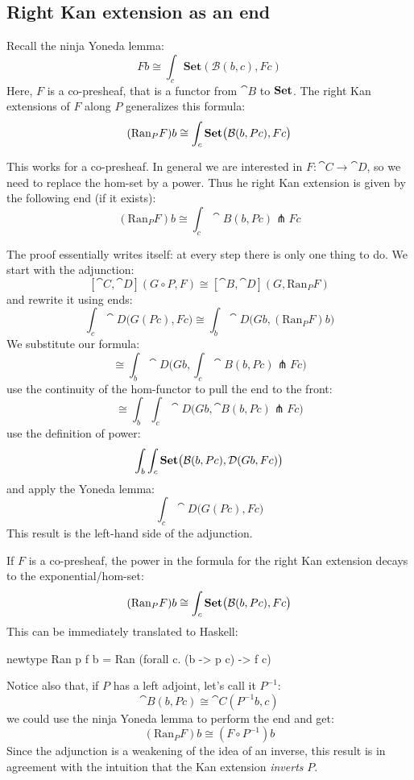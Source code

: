 \documentclass[DaoFP]{subfiles}
\begin{document}
\subsection{Right Kan extension as an end}

Recall the ninja Yoneda lemma:
\[ F b \cong \int_{c} \mathbf{Set} (\mathcal{B}(b, c), F c) \]
Here, $F$ is a co-presheaf, that is a functor from $\cat B$ to $\mathbf{Set}$. The right Kan extensions of $F$ along $P$ generalizes this formula:
\[ (\text{Ran}_P F) b \cong \int_c \mathbf{Set} \big( \mathcal{B} (b, P c), F c\big) \]

This works for a co-presheaf. In general we are interested in $F \colon \cat C \to \cat D$, so we need to replace the hom-set by a power. Thus he right Kan extension is given by the following end (if it exists):
 \[ (\text{Ran}_P F) b \cong \int_c \cat B (b, P c) \pitchfork F c \]
 
 The proof essentially writes itself: at every step there is only one thing to do. We start with the adjunction:
  \[ [\cat C, \cat D](G \circ P, F) \cong [\cat B, \cat D](G, \text{Ran}_P F) \]
and rewrite it using ends:
 \[ \int_c \cat D \big(G ( P c), F c\big) \cong \int_b \cat D\big(G b, (\text{Ran}_P F) b\big) \]
We substitute our formula:
 \[ \cong  \int_b \cat D\big(G b,\int_c \cat B (b, P c) \pitchfork F c \big)\]
use the continuity of the hom-functor to pull the end to the front:
\[  \cong  \int_b \int_c \cat D\big(G b, \cat B (b, P c) \pitchfork F c \big) \]
use the definition of power:
\[ \int_b \int_c \mathbf{Set} \big(  \mathcal{B} (b, P c), \mathcal{D} (G b, F c) \big) \]
and apply the Yoneda lemma:
\[ \int_c  \cat D \big(G (P c), F c\big) \]
This result is the left-hand side of the adjunction.
 
If $F$ is a co-presheaf, the power in the formula for the right Kan extension decays to the exponential/hom-set:
  \[ (\text{Ran}_P F) b \cong \int_c \mathbf{Set} \big( \mathcal{B} (b, P c), F c\big) \]
This can be immediately translated to Haskell:
 \begin{haskell}
 newtype Ran p f b = Ran (forall c. (b -> p c) -> f c)
 \end{haskell}
 
 Notice also that, if $P$ has a left adjoint, let's call it $P^{-1}$:
 \[ \cat B(b, P c) \cong \cat C(P^{-1} b, c) \]
 we could use the ninja Yoneda lemma to perform the end and get:
 \[  (\text{Ran}_P F) b \cong (F \circ P^{-1}) b \]
 Since the adjunction is a weakening of the idea of an inverse, this result is in agreement with the intuition that the Kan extension \emph{inverts} $P$.
 
\end{document}
